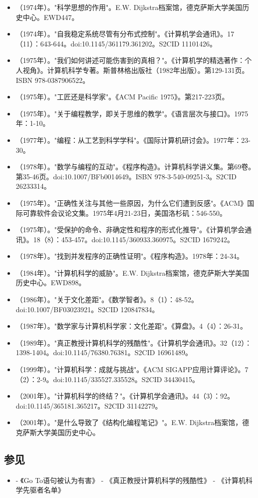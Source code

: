 \begin{itemize}
\item （1974年）。"科学思想的作用"。E.W. Dijkstra档案馆，德克萨斯大学美国历史中心。EWD447。
\item （1974年）。"自我稳定系统尽管有分布式控制"。《计算机学会通讯》。17（11）：643-644。doi:10.1145/361179.361202。S2CID 11101426。
\item （1975年）。"我们如何讲述可能伤害到的真相？"。《计算机学的精选著作：个人视角》。计算机科学专著。斯普林格出版社（1982年出版）。第129-131页。ISBN 978-0387906522。
\item （1975年）。"工匠还是科学家"。《ACM Pacific 1975》。第217-223页。
\item （1975年）。"关于编程教学，即关于思维的教学"。《语言层次与接口》。1975年：1-10。
\item （1977年）。"编程：从工艺到科学学科"。《国际计算机研讨会》。1977年：23-30。
\item （1978年）。"数学与编程的互动"。《程序构造》。计算机科学讲义集。第69卷。第35-46页。doi:10.1007/BFb0014649。ISBN 978-3-540-09251-3。S2CID 26233314。
\item （1975年）。"正确性关注与其他一些原因，为什么它们遭到反感"。《ACM》国际可靠软件会议论文集。1975年4月21-23日，美国洛杉矶：546-550。
\item （1975年）。"受保护的命令、非确定性和程序的形式化推导"。《计算机学会通讯》。18（8）：453-457。doi:10.1145/360933.360975。S2CID 1679242。
\item （1978年）。"找到并发程序的正确性证明"。《程序构造》。1978年：24-34。
\item （1984年）。"计算机科学的威胁"。E.W. Dijkstra档案馆，德克萨斯大学美国历史中心。EWD898。
\item （1986年）。"关于文化差距"。《数学智者》。8（1）：48-52。doi:10.1007/BF03023921。S2CID 120847834。
\item （1987年）。"数学家与计算机科学家：文化差距"。《算盘》。4（4）：26-31。
\item （1989年）。"真正教授计算机科学的残酷性"。《计算机学会通讯》。32（12）：1398-1404。doi:10.1145/76380.76381。S2CID 16961489。
\item （1999年）。"计算机科学：成就与挑战"。《ACM SIGAPP应用计算评论》。7（2）：2-9。doi:10.1145/335527.335528。S2CID 34430415。
\item （2001年）。"计算机科学的终结？"。《计算机学会通讯》。44（3）：92。doi:10.1145/365181.365217。S2CID 31142279。
\item （2001年）。"是什么导致了《结构化编程笔记》"。E.W. Dijkstra档案馆，德克萨斯大学美国历史中心。
\end{itemize}
\subsection{参见}
\begin{itemize}
\item - 《Go To语句被认为有害》
- 《真正教授计算机科学的残酷性》
- 《计算机科学先驱者名单》
\end{itemize}